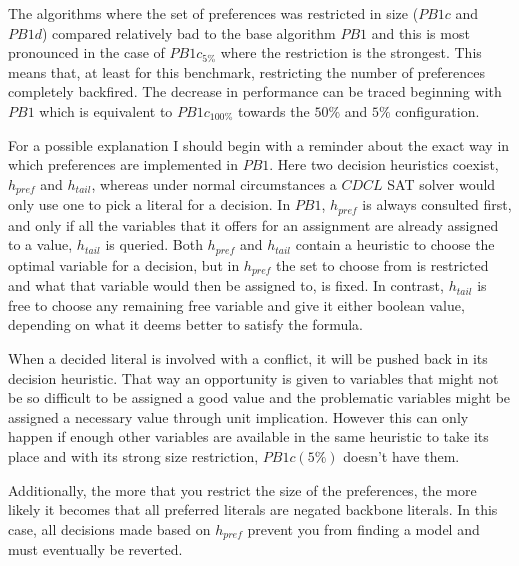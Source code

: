 The algorithms where the set of preferences was restricted in size ($PB1c$ and $PB1d$) compared relatively bad to the base algorithm $PB1$ and this is most pronounced in the case of $PB1c_{5\%}$ where the restriction is the strongest. This means that, at least for this benchmark, restricting the number of preferences completely backfired. The decrease in performance can be traced beginning with $PB1$ which is equivalent to $PB1c_{100\%}$ towards the $50\%$ and $5\%$ configuration.


For a possible explanation I should begin with a reminder about the exact way in which preferences are implemented in $PB1$. Here two decision heuristics coexist, $h_{pref}$ and $h_{tail}$, whereas under normal circumstances a $CDCL$ SAT solver would only use one to pick a literal for a decision. In $PB1$, $h_{pref}$ is always consulted first, and only if all the variables that it offers for an assignment are already assigned to a value, $h_{tail}$ is queried. Both $h_{pref}$ and $h_{tail}$ contain a heuristic to choose the optimal variable for a decision, but in $h_{pref}$ the set to choose from is restricted and what that variable would then be assigned to, is fixed. In contrast, $h_{tail}$ is free to choose any remaining free variable and give it either boolean value, depending on what it deems better to satisfy the formula.

When a decided literal is involved with a conflict, it will be pushed back in its decision heuristic. That way an opportunity is given to variables that might not be so difficult to be assigned a good value and the problematic variables might be assigned a necessary value through unit implication. 
However this can only happen if enough other variables are available in the same heuristic to take its place and with its strong size restriction, $PB1c(5\%)$ doesn't have them.

Additionally, the more that you restrict the size of the preferences, the more likely it becomes that all preferred literals are negated backbone literals. In this case, all decisions made based on $h_{pref}$ prevent you from finding a model and must eventually be reverted.

